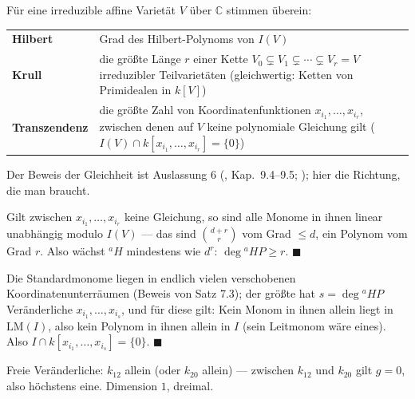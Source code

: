\begin{merksatz}
Für eine irreduzible affine Varietät $V$ über $\mathbb C$ stimmen überein:
\begin{center}
{\small
\renewcommand{\arraystretch}{1.5}
\begin{tabular}{@{}P{2.6cm}P{6.2cm}@{}}
\toprule
\textbf{Hilbert} & Grad des Hilbert-Polynoms von $I(V)$\\
\textbf{Krull} & die größte Länge $r$ einer Kette $V_0\subsetneq V_1\subsetneq\cdots\subsetneq V_r = V$ irreduzibler Teilvarietäten (gleichwertig: Ketten von Primidealen in $k[V]$)\\
\textbf{Transzendenz} & die größte Zahl von Koordinatenfunktionen $x_{i_1}, \ldots, x_{i_r}$, zwischen denen auf $V$ keine polynomiale Gleichung gilt ($I(V)\cap k[x_{i_1}, \ldots, x_{i_r}] = \{0\}$)\\
\bottomrule
\end{tabular}}
\end{center}
Der Beweis der Gleichheit ist Auslassung 6 (, Kap.~9.4--9.5; ); hier die Richtung, die man braucht.

Gilt zwischen $x_{i_1}, \ldots, x_{i_r}$ keine Gleichung, so sind alle Monome in ihnen linear unabhängig modulo $I(V)$ --- das sind $\binom{d + r}{r}$ vom Grad $\le d$, ein Polynom vom Grad $r$. Also wächst ${}^{a}\!H$ mindestens wie $d^{r}$: $\deg{}^{a}\!HP\ge r$. $\blacksquare$

Die Standardmonome liegen in endlich vielen verschobenen Koordinatenunterräumen (Beweis von Satz 7.3); der größte hat $s = \deg{}^{a}\!HP$ Veränderliche $x_{i_1}, \ldots, x_{i_s}$, und für diese gilt: Kein Monom in ihnen allein liegt in $\mathrm{LM}(I)$, also kein Polynom in ihnen allein in $I$ (sein Leitmonom wäre eines). Also $I\cap k[x_{i_1}, \ldots, x_{i_s}] = \{0\}$. $\blacksquare$

Freie Veränderliche: $k_{12}$ allein (oder $k_{20}$ allein) --- zwischen $k_{12}$ und $k_{20}$ gilt $g = 0$, also höchstens eine. Dimension $1$, dreimal. \checkmark

\begin{center}
\begin{minipage}{0.88\textwidth}
\end{minipage}
\end{center}
\end{merksatz}

